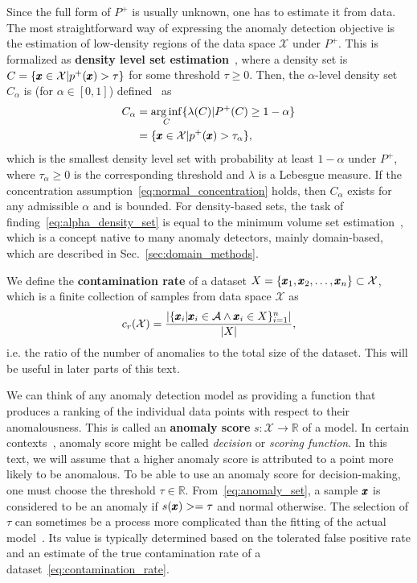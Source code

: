 Since the full form of $P^+$ is usually unknown, one has to estimate it from data. The most straightforward way of expressing the anomaly detection objective is the estimation of low-density regions of the data space $\mathcal{X}$ under $P^+$. This is formalized as \textbf{density level set estimation}~\cite{ben1997learning}, where a density set is $C = \lbrace \pmb{{x}} \in \mathcal{X} \vert p^+(\pmb{{x}}) > \tau \rbrace$ for some threshold $\tau \geq 0$. Then, the $\alpha$-level density set $C_{\alpha}$ is (for $\alpha \in [0,1]$) defined~\cite{ruff2020unifying} as 
\begin{align} \label{eq:alpha_density_set}
    C_{\alpha} & = \operatorname*{arg\,inf}_C \lbrace \lambda(C) \vert P^+(C) \geq 1-\alpha \rbrace \nonumber \\
               & = \lbrace \pmb{{x}} \in \mathcal{X} \vert p^+(\pmb{{x}}) > \tau_{\alpha} \rbrace,
\end{align}
which is the smallest density level set with probability at least $1-\alpha$ under $P^+$, where $\tau_{\alpha} \geq 0$ is the corresponding threshold and $\lambda$ is a Lebesgue measure. If the concentration assumption~\eqref{eq:normal_concentration} holds, then $C_{\alpha}$ exists for any admissible $\alpha$ and is bounded. For density-based sets, the task of finding~\eqref{eq:alpha_density_set} is equal to the minimum volume set estimation~\cite{polonik1997minimum}, which is a concept native to many anomaly detectors, mainly domain-based, which are described in Sec.~\ref{sec:domain_methods}.

We define the \textbf{contamination rate} of a dataset $X = \lbrace \pmb{{x}}_1, \pmb{{x}}_2, \ldots, \pmb{{x}}_n \rbrace \subset \mathcal{X}$, which is a finite collection of samples from data space $\mathcal{X}$ as
\begin{equation} \label{eq:contamination_rate}
c_r(\mathcal{X})=\frac{|\{\pmb{{x}}_{i}|\pmb{{x}}_{i}\in \mathcal{A} \wedge \pmb{{x}}_i \in X \}_{i=1}^n|}{|X|},
\end{equation}
i.e. the ratio of the number of anomalies to the total size of the dataset. This will be useful in later parts of this text. 

We can think of any anomaly detection model as providing a function that produces a ranking of the individual data points with respect to their anomalousness. This is called an \textbf{anomaly score} $s:\mathcal{X}\rightarrow\mathbb{R}$ of a model. In certain contexts~\cite{pedregosa2011scikit}, anomaly score might be called \textit{decision }or \textit{scoring function}. In this text, we will assume that a higher anomaly score is attributed to a point more likely to be anomalous. To be able to use an anomaly score for decision-making, one must choose the threshold $\tau\in\mathbb{R}$. From~\eqref{eq:anomaly_set}, a sample $\pmb{{x}}$ is considered to be an anomaly if $s(\pmb{{x}})>=\tau$ and normal otherwise. The selection of $\tau$ can sometimes be a process more complicated than the fitting of the actual model~\cite{ali2013automated}.  Its value is typically determined based on the tolerated false positive rate and an estimate of the true contamination rate of a dataset~\eqref{eq:contamination_rate}.

